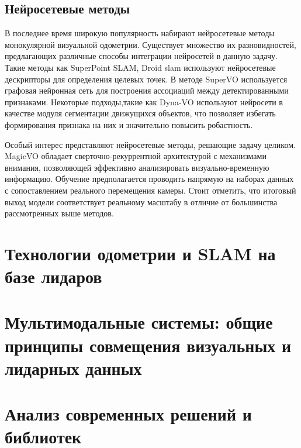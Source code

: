 \subsection{Нейросетевые методы}
В последнее время широкую популярность набирают нейросетевые методы монокулярной
визуальной одометрии. Существует множество их разновидностей, предлагающих различные
способы интеграции нейросетей в данную задачу. Такие методы как SuperPoint SLAM, Droid slam
используют нейросетевые дескрипторы для определения целевых точек. В методе SuperVO используется
графовая нейронная сеть для построения ассоциаций между детектированными признаками. 
Некоторые подходы,такие как Dyna-VO используют нейросети в качестве модуля сегментации
движущихся объектов, что позволяет избегать формирования признака на них и значительно 
повысить робастность.

Особый интерес представляют нейросетевые методы, решающие задачу целиком. MagicVO обладает
сверточно-рекуррентной архитектурой с механизмами внимания, позволяющей эффективно 
анализировать визуально-временную информацию. Обучение предполагается проводить напрямую
на наборах данных с сопоставлением реального перемещения камеры. Стоит отметить, что
итоговый выход модели соответствует реальному масштабу в отличие от большинства рассмотренных
выше методов. 

\section{Технологии одометрии и SLAM на базе лидаров}
\section{Мультимодальные системы: общие принципы совмещения визуальных и лидарных данных}
\section{Анализ современных решений и библиотек}












